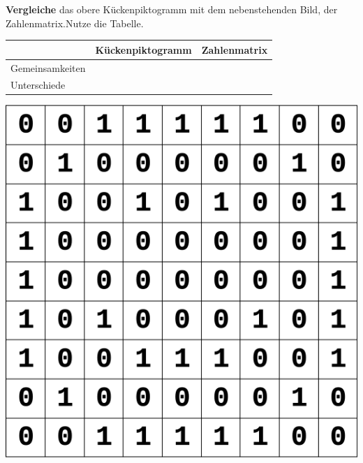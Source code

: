 \documentclass[a4paper, 12pt]{article}
\begin{document}
\aufgabe{}
	\begin{minipage}{0.65\textwidth}\vspace{0pt}
		\textbf{Vergleiche} das obere Kückenpiktogramm mit dem nebenstehenden Bild, der Zahlenmatrix.\newline Nutze die Tabelle.
		
			\begin{tabular}[h]{|l|p{3.5cm}|p{3.5cm}|}
				\hline
				& Kückenpiktogramm & Zahlenmatrix \\\hline
				\rule{0pt}{40pt}Gemeinsamkeiten & \multicolumn{2}{c|}{ } \\\hline
				\rule{0pt}{40pt}Unterschiede & & \\\hline				
			\end{tabular}
	\end{minipage}
	\hfill
	\begin{minipage}{0.25\textwidth}\vspace{0pt}
		\includegraphics[width=\linewidth]{A_3.png}
	\end{minipage}
	
\end{document}
